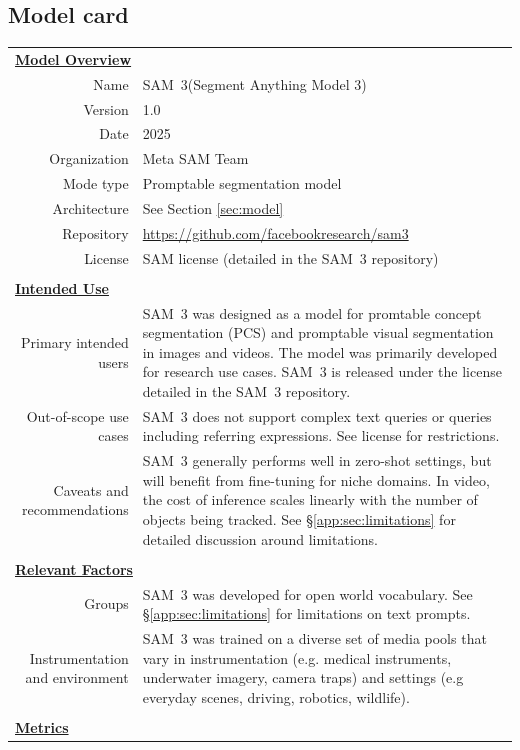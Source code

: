 \documentclass[]{fairmeta}
\newcommand{\model}{SAM~3\xspace}
\begin{document}
\subsection{Model card}
\vspace{2em}
\begin{table}[!htbp]\centering\fontsize{7.5}{8.4}\selectfont
\begin{tabular*}{\linewidth}{r|p{10cm}}
\multicolumn{2}{l}{\textbf{\underline{Model Overview}}} \\
Name & \model (Segment Anything Model 3) \\
Version & 1.0 \\
Date & 2025 \\
Organization & Meta SAM Team \\
Mode type & Promptable segmentation model \\
Architecture & See Section \ref{sec:model} \\
Repository & \url{https://github.com/facebookresearch/sam3} \\
License & SAM license (detailed in the \model repository)  \\
\multicolumn{2}{c}{} \\
\multicolumn{2}{l}{\textbf{\underline{Intended Use}}} \\

Primary intended users & \model was designed as a model for promtable concept segmentation (PCS) and promptable visual segmentation in images and videos. The model was primarily developed for research use cases. \model is released under the license detailed in the \model repository. \\
Out-of-scope use cases & \model does not support complex text queries or queries including referring expressions. See license for restrictions. \\
Caveats and recommendations & \model generally performs well in zero-shot settings, but will benefit from fine-tuning for niche domains.  In video, the cost of inference scales linearly with the number of objects being tracked. See \S\ref{app:sec:limitations} for detailed discussion around limitations. \\
\multicolumn{2}{c}{} \\
\multicolumn{2}{l}{\bf\underline{Relevant Factors}} \\
Groups & \model was developed for open world vocabulary. See \S\ref{app:sec:limitations} for limitations on text prompts.\\
Instrumentation and environment & \model was trained on a diverse set of media pools that vary in instrumentation (e.g. medical instruments, underwater imagery, camera traps) and settings (e.g everyday scenes, driving, robotics, wildlife). \\
\multicolumn{2}{c}{} \\
\multicolumn{2}{l}{\bf\underline{Metrics}} \\


\end{tabular*}
\end{table}
\end{document}
